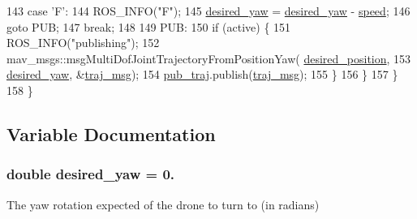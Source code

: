 \begin{DoxyCode}
143       \textcolor{keywordflow}{case} \textcolor{charliteral}{'F'}:
144         ROS\_INFO(\textcolor{stringliteral}{"F"});
145         \hyperlink{oculus-control-keyboard_8cpp_a03a69ef33d756512293e67791ab5f265}{desired\_yaw} = \hyperlink{oculus-control-keyboard_8cpp_a03a69ef33d756512293e67791ab5f265}{desired\_yaw} - \hyperlink{oculus-control-keyboard_8cpp_a7f7e4724cf57d59513b39c5ecc81adc8}{speed};
146         \textcolor{keywordflow}{goto} PUB;
147         \textcolor{keywordflow}{break};
148 
149       PUB:
150         \textcolor{keywordflow}{if} (active) \{
151           ROS\_INFO(\textcolor{stringliteral}{"publishing"});
152               mav\_msgs::msgMultiDofJointTrajectoryFromPositionYaw(
      \hyperlink{oculus-control-keyboard_8cpp_a608d9948c063034b7605598daaeccc3e}{desired\_position},
153                   \hyperlink{oculus-control-keyboard_8cpp_a03a69ef33d756512293e67791ab5f265}{desired\_yaw}, &\hyperlink{oculus-control-keyboard_8cpp_a090c0766fbb77862dd8cc0cca99d688b}{traj\_msg});
154           \hyperlink{oculus-control-keyboard_8cpp_a92b67ae724bc0d23b8e85e92e89403df}{pub\_traj}.publish(\hyperlink{oculus-control-keyboard_8cpp_a090c0766fbb77862dd8cc0cca99d688b}{traj\_msg});
155         \}
156       \}
157     \}
158 \}
\end{DoxyCode}


\subsection{Variable Documentation}
\subsubsection[{\texorpdfstring{desired\+\_\+yaw}{desired_yaw}}]{\setlength{\rightskip}{0pt plus 5cm}double desired\+\_\+yaw = 0.}\hypertarget{oculus-control-keyboard_8cpp_a03a69ef33d756512293e67791ab5f265}{}\label{oculus-control-keyboard_8cpp_a03a69ef33d756512293e67791ab5f265}


The yaw rotation expected of the drone to turn to (in radians) 

